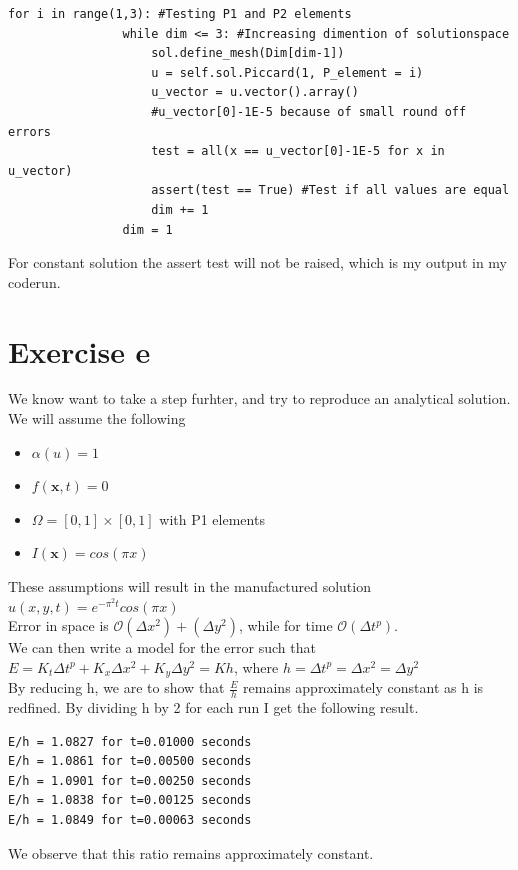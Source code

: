 \documentclass[a4paper,norsk]{article}
\begin{document}
\begin{lstlisting}[style=codesnippet]
    for i in range(1,3): #Testing P1 and P2 elements
                while dim <= 3: #Increasing dimention of solutionspace
                    sol.define_mesh(Dim[dim-1])
                    u = self.sol.Piccard(1, P_element = i)
                    u_vector = u.vector().array()
                    #u_vector[0]-1E-5 because of small round off errors
                    test = all(x == u_vector[0]-1E-5 for x in u_vector)
                    assert(test == True) #Test if all values are equal
                    dim += 1
                dim = 1
\end{lstlisting}
For constant solution the assert test will not be raised, which is my output in my coderun.

\section*{Exercise e}
We know want to take a step furhter, and try to reproduce an analytical solution. We will assume the following
\begin{itemize}
\item $\alpha(u) = 1$
\item $f(\textbf{x},t) = 0$
\item $\Omega = [0,1] \times [0,1]$ with P1 elements
\item $I(\textbf{x}) = cos(\pi x) $ 
\end{itemize}
These assumptions will result in the manufactured solution $u(x,y,t) = e^{-\pi^2 t} cos(\pi x)$ \\
Error in space is $\mathcal{O}(\Delta x^2) + (\Delta y^2)$, while for time $\mathcal{O}(\Delta t^p)$. \\
We can then write a model for the error such that \\
$E = K_t\Delta t^p + K_x \Delta x^2 + K_y \Delta y^2 = Kh$, where $h = \Delta t^p = \Delta x^2 = \Delta y^2$ \\
By reducing h, we are to show that $\frac{E}{h}$ remains approximately constant as h is redfined. By dividing h by 2 for each run I get the following result. 

\begin{lstlisting}[style = terminal]
E/h = 1.0827 for t=0.01000 seconds
E/h = 1.0861 for t=0.00500 seconds
E/h = 1.0901 for t=0.00250 seconds
E/h = 1.0838 for t=0.00125 seconds
E/h = 1.0849 for t=0.00063 seconds
\end{lstlisting} 
We observe that this ratio remains approximately constant.
\end{document}
